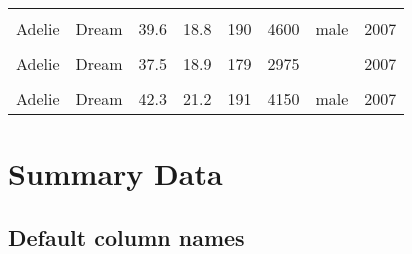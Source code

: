 \documentclass[
  landscape]{article}
\begin{document}
\begin{longtable}[l]{llllllll}
\cellcolor{gray!15}{Adelie} & \cellcolor{gray!15}{Dream} & \cellcolor{gray!15}{37.0} & \cellcolor{gray!15}{16.9} & \cellcolor{gray!15}{185} & \cellcolor{gray!15}{3000} & \cellcolor{gray!15}{female} & \cellcolor{gray!15}{2007}\\
Adelie & Dream & 39.6 & 18.8 & 190 & 4600 & male & 2007\\
\cellcolor{gray!15}{Adelie} & \cellcolor{gray!15}{Dream} & \cellcolor{gray!15}{41.1} & \cellcolor{gray!15}{19.0} & \cellcolor{gray!15}{182} & \cellcolor{gray!15}{3425} & \cellcolor{gray!15}{male} & \cellcolor{gray!15}{2007}\\
Adelie & Dream & 37.5 & 18.9 & 179 & 2975 &  & 2007\\
\cellcolor{gray!15}{Adelie} & \cellcolor{gray!15}{Dream} & \cellcolor{gray!15}{36.0} & \cellcolor{gray!15}{17.9} & \cellcolor{gray!15}{190} & \cellcolor{gray!15}{3450} & \cellcolor{gray!15}{female} & \cellcolor{gray!15}{2007}\\
Adelie & Dream & 42.3 & 21.2 & 191 & 4150 & male & 2007\\*
\end{longtable}

\hypertarget{summary-data}{%
\section{Summary Data}\label{summary-data}}

\hypertarget{default-column-names-1}{%
\subsection{Default column names}\label{default-column-names-1}}
\end{document}
